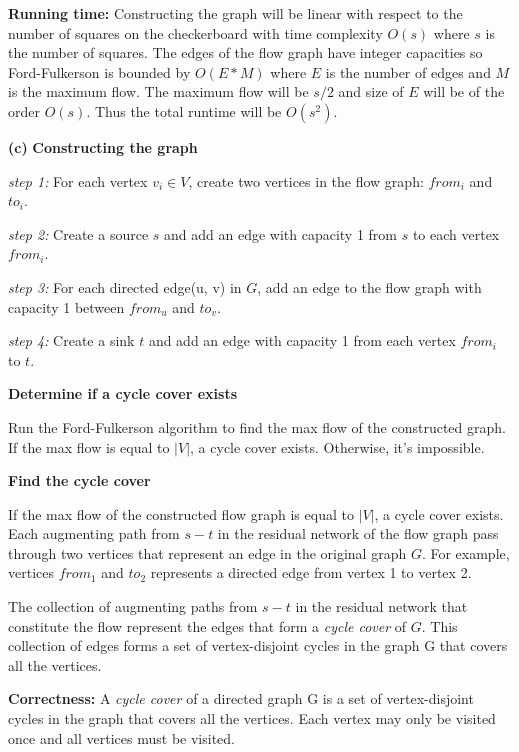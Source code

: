 \documentclass[11pt]{article}
\renewcommand\part[1]{\vspace{.10in}\textbf{(#1)}}
\newcommand\correctness{\vspace{.10in}\textbf{Correctness: }}
\newcommand\runtime{\vspace{.10in}\textbf{Running time: }}
\begin{document}
\runtime Constructing the graph will be linear with respect to the number of squares on the checkerboard with time complexity $O(s)$ where $s$ is the number of squares. The edges of the flow graph have integer capacities so Ford-Fulkerson is bounded by $O(E * M)$ where $E$ is the number of edges and $M$ is the maximum flow. The maximum flow will be $s/2$ and size of $E$ will be of the order $O(s)$. Thus the total runtime will be $O(s^2)$.


\part{c} \textbf{Constructing the graph} 

\textit{step 1:} For each vertex $v_i \in V$, create two vertices in the flow graph: $from_i$ and $to_i$.

\textit{step 2:} Create a source $s$ and add an edge with capacity 1 from $s$ to each vertex $from_i$. 

\textit{step 3:} For each directed edge(u, v) in $G$, add an edge to the flow graph with capacity 1 between $from_u$ and $to_v$.

\textit{step 4: } Create a sink $t$ and add an edge with capacity 1 from each vertex $from_i$ to $t$.

\textbf{Determine if a cycle cover exists} 

Run the Ford-Fulkerson algorithm to find the max flow of the constructed graph. If the max flow is equal to $|V|$, a cycle cover exists. Otherwise, it's impossible.

\textbf{Find the cycle cover}

If the max flow of the constructed flow graph is equal to $|V|$, a cycle cover exists. Each augmenting path from $s-t$ in the residual network of the flow graph pass through two vertices that represent an edge in the original graph $G$. For example, vertices $from_1$ and $to_2$ represents a directed edge from vertex 1 to vertex 2. 

The collection of augmenting paths from $s-t$ in the residual network that constitute the flow represent the edges that form a \textit{cycle cover} of $G$. This collection of edges forms a set of vertex-disjoint cycles in the graph G that covers all the vertices.

\correctness A \textit{cycle cover} of a directed graph G is a set of vertex-disjoint cycles in the graph that covers all the vertices. Each vertex may only be visited once and all vertices must be visited. 
\end{document}

